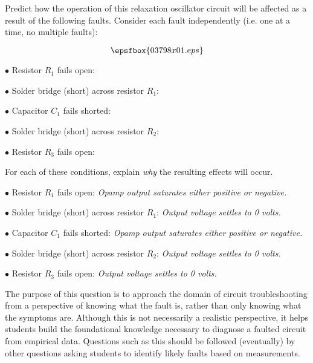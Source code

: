 

Predict how the operation of this relaxation oscillator circuit will be affected as a result of the following faults.  Consider each fault independently (i.e. one at a time, no multiple faults):

$$\epsfbox{03798x01.eps}$$

\medskip
\item{$\bullet$} Resistor $R_1$ fails open:
\vskip 5pt
\item{$\bullet$} Solder bridge (short) across resistor $R_1$:
\vskip 5pt
\item{$\bullet$} Capacitor $C_1$ fails shorted:
\vskip 5pt
\item{$\bullet$} Solder bridge (short) across resistor $R_2$:
\vskip 5pt
\item{$\bullet$} Resistor $R_3$ fails open:
\medskip

For each of these conditions, explain {\it why} the resulting effects will occur.







\medskip
\item{$\bullet$} Resistor $R_1$ fails open: {\it Opamp output saturates either positive or negative.}
\vskip 5pt
\item{$\bullet$} Solder bridge (short) across resistor $R_1$: {\it Output voltage settles to 0 volts.}
\vskip 5pt
\item{$\bullet$} Capacitor $C_1$ fails shorted: {\it Opamp output saturates either positive or negative.}
\vskip 5pt
\item{$\bullet$} Solder bridge (short) across resistor $R_2$: {\it Output voltage settles to 0 volts.}
\vskip 5pt
\item{$\bullet$} Resistor $R_3$ fails open: {\it Output voltage settles to 0 volts.}
\medskip







The purpose of this question is to approach the domain of circuit troubleshooting from a perspective of knowing what the fault is, rather than only knowing what the symptoms are.  Although this is not necessarily a realistic perspective, it helps students build the foundational knowledge necessary to diagnose a faulted circuit from empirical data.  Questions such as this should be followed (eventually) by other questions asking students to identify likely faults based on measurements.





